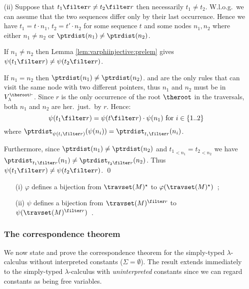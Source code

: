 \noindent (ii) Suppose that $t_1 \filter r \neq t_2 \filter r$ then
necessarily $t_1 \neq t_2$. W.l.o.g.\ we can assume that the two
sequences differ only by their last occurrence. Hence we have $t_1 =
t \cdot n_1$, $t_2 = t' \cdot n_2$ for some sequence $t$ and some
nodes $n_1, n_2$ where either $n_1\neq n_2$ or $\ptrdist(n_1) \neq
\ptrdist(n_2)$.

If $n_1 \neq n_2$ then Lemma \ref{lem:varphiinjective:prelem} gives
$\psi( t_1\filter r ) \neq \psi( t_2\filter r )$.

If $n_1 = n_2$ then $\ptrdist(n_1) \neq \ptrdist(n_2)$.
 and  are the only rules
that can visit the same node with two different pointers, thus $n_1$
and $n_2$ must be in $V_\lambda^{\theroot\vdash}$. Since $r$ is the
only occurrence of the root $\theroot$ in the traversals, both $n_1$
and $n_2$ are her.\ just.\ by $r$. Hence:
\begin{equation*}
\psi(t_1\filter r) = \psi(t\filter r) \cdot \psi(n_1) \mbox{ for $i
\in \{1..2\}$}
\end{equation*}
where $\ptrdist_{\psi(t_i\filter r)}(\psi(n_i)) =
\ptrdist_{t_i\filter r}(n_i)$.

Furthermore, since $\ptrdist(n_1) \neq \ptrdist(n_2)$ and
${t_1}_{<n_1} = {t_2}_{<n_2}$ we have $\ptrdist_{t_1\filter r}(n_1)
\neq \ptrdist_{t_2\filter r}(n_2)$. Thus $\psi(t_1\filter r) \neq
\psi(t_2\filter r)$. \qed


\begin{corollary} \hfill
\label{cor:varphi_bij}
\begin{itemize}
\item[(i)] $\varphi$ defines a bijection from $\travset(M)^\star$
to $\varphi(\travset(M)^\star)$\ ;
\item[(ii)] $\psi$ defines a bijection from $\travset(M)^{\filter r}$ to
$\psi(\travset(M)^{\filter r})$\ .
\end{itemize}
\end{corollary}

\subsubsection{The correspondence theorem}
We now state and prove the correspondence theorem for the
simply-typed $\lambda$-calculus without interpreted constants
($\Sigma = \emptyset$). The result extends immediately to the
simply-typed $\lambda$-calculus with \emph{uninterpreted} constants
since we can regard constants as being free variables.


